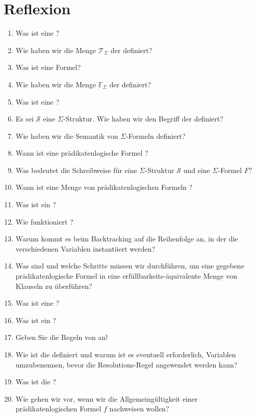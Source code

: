 \section{Reflexion}
\begin{enumerate}
\item Was ist eine ?
\item Wie haben wir die Menge $\mathcal{T}_\Sigma$ der  definiert?
\item Was ist eine  Formel?
\item Wie haben wir die Menge $\mathbb{F}_\Sigma$ der  definiert?
\item Was ist eine ?
\item Es sei $\mathcal{S}$ eine  $\Sigma$-Struktur.  Wie haben wir den Begriff der
       definiert?
\item Wie haben wir die Semantik von $\Sigma$-Formeln definiert?
\item Wann ist eine prädikatenlogische Formel ?
\item Was bedeutet die Schreibweise  für eine $\Sigma$-Struktur $\mathcal{S}$ und eine
      $\Sigma$-Formel $F$?
\item Wann ist eine Menge von prädikatenlogischen Formeln ?
\item Was ist ein ?
\item Wie funktioniert ?
\item Warum kommt es beim Backtracking auf die Reihenfolge an, in der die verschiedenen Variablen instantiiert
      werden?
\item Was sind  und welche Schritte müssen wir durchführen, um eine gegebene
      prädikatenlogische Formel in eine erfüllbarkeits-äquivalente Menge von Klauseln zu überführen?
\item Was ist eine ?
\item Was ist ein ?
\item Geben Sie die Regeln von  an!
\item Wie ist die  definiert und warum ist es eventuell erforderlich, Variablen umzubenennen,
      bevor die Resolutions-Regel angewendet werden kann?
\item Was ist die ?
\item Wie gehen wir vor, wenn wir die Allgemeingültigkeit einer prädikatenlogischen Formel $f$ nachweisen wollen?
\end{enumerate}

